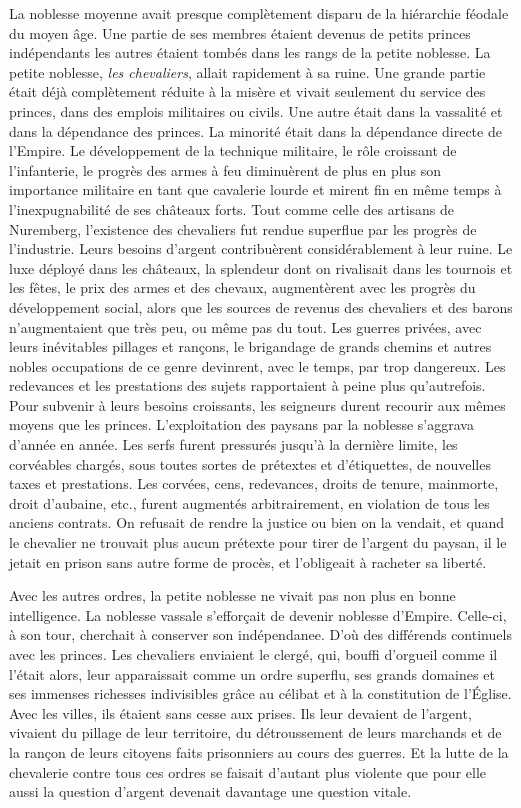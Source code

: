 \documentclass[french,twoside]{book} %
\begin{document}
La noblesse moyenne avait presque complètement disparu de la hiérarchie féodale du moyen âge. Une partie de ses membres étaient devenus de petits princes indépendants les autres étaient tombés dans les rangs de la petite noblesse. La petite noblesse, \emph{les chevaliers}, allait rapidement à sa ruine. Une grande partie était déjà complètement réduite à la misère et vivait seulement du service des princes, dans des emplois militaires ou civils. Une autre était dans la vassalité et dans la dépendance des princes. La minorité était dans la dépendance directe de l’Empire. Le développement de la technique militaire, le rôle croissant de l’infanterie, le progrès des armes à feu diminuèrent de plus en plus son importance militaire en tant que cavalerie lourde et mirent fin en même temps à l’inexpugnabilité de ses châteaux forts. Tout comme celle des artisans de Nuremberg, l’existence des chevaliers fut rendue superflue par les progrès de l’industrie. Leurs besoins d’argent contribuèrent considérablement à leur ruine. Le luxe déployé dans les châteaux, la splendeur dont on rivalisait dans les tournois et les fêtes, le prix des armes et des chevaux, augmentèrent avec les progrès du développement social, alors que les sources de revenus des chevaliers et des barons n’augmentaient que très peu, ou même pas du tout. Les guerres privées, avec leurs inévitables pillages et rançons, le brigandage de grands chemins et autres nobles occupations de ce genre devinrent, avec le temps, par trop dangereux. Les redevances et les prestations des sujets rapportaient à peine plus qu’autrefois. Pour subvenir à leurs besoins croissants, les seigneurs durent recourir aux mêmes moyens que les princes. L’exploitation des paysans par la noblesse s’aggrava d’année en année. Les serfs furent pressurés jusqu’à la dernière limite, les corvéables chargés, sous toutes sortes de prétextes et d’étiquettes, de nouvelles taxes et prestations. Les corvées, cens, redevances, droits de tenure, mainmorte, droit d’aubaine, etc., furent augmentés arbitrairement, en violation de tous les anciens contrats. On refusait de rendre la justice ou bien on la vendait, et quand le chevalier ne trouvait plus aucun prétexte pour tirer de l’argent du paysan, il le jetait en prison sans autre forme de procès, et l’obligeait à racheter sa liberté.\par
Avec les autres ordres, la petite noblesse ne vivait pas non plus en bonne intelligence. La noblesse vassale s’efforçait de devenir noblesse d’Empire. Celle-ci, à son tour, cherchait à conserver son indépendanee. D’où des différends continuels avec les princes. Les chevaliers enviaient le clergé, qui, bouffi d’orgueil comme il l’était alors, leur apparaissait comme un ordre superflu, ses grands domaines et ses immenses richesses indivisibles grâce au célibat et à la constitution de l’Église. Avec les villes, ils étaient sans cesse aux prises. Ils leur devaient de l’argent, vivaient du pillage de leur territoire, du détroussement de leurs marchands et de la rançon de leurs citoyens faits prisonniers au cours des guerres. Et la lutte de la chevalerie contre tous ces ordres se faisait d’autant plus violente que pour elle aussi la question d’argent devenait davantage une question vitale.\par
\end{document}

